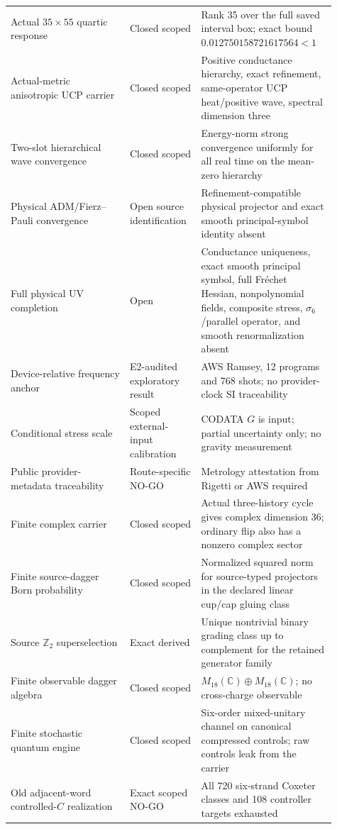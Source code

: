 \documentclass[11pt]{article}
\theoremstyle{definition}
\theoremstyle{remark}
\begin{document}
\begin{longtable}{>{\raggedright\arraybackslash}p{0.34\linewidth} >{\raggedright\arraybackslash}p{0.19\linewidth} >{\raggedright\arraybackslash}p{0.38\linewidth}}
Actual $35\times55$ quartic response & Closed scoped & Rank 35 over the full saved interval box; exact bound $0.012750158721617564<1$ \\
Actual-metric anisotropic UCP carrier & Closed scoped & Positive conductance hierarchy, exact refinement, same-operator UCP heat/positive wave, spectral dimension three \\
Two-slot hierarchical wave convergence & Closed scoped & Energy-norm strong convergence uniformly for all real time on the mean-zero hierarchy \\
Physical ADM/Fierz--Pauli convergence & Open source identification & Refinement-compatible physical projector and exact smooth principal-symbol identity absent \\
Full physical UV completion & Open & Conductance uniqueness, exact smooth principal symbol, full Fr\'echet Hessian, nonpolynomial fields, composite stress, $\sigma_6$/parallel operator, and smooth renormalization absent \\
Device-relative frequency anchor & E2-audited exploratory result & AWS Ramsey, 12 programs and 768 shots; no provider-clock SI traceability \\
Conditional stress scale & Scoped external-input calibration & CODATA $G$ is input; partial uncertainty only; no gravity measurement \\
Public provider-metadata traceability & Route-specific NO-GO & Metrology attestation from Rigetti or AWS required \\
Finite complex carrier & Closed scoped & Actual three-history cycle gives complex dimension 36; ordinary flip also has a nonzero complex sector \\
Finite source-dagger Born probability & Closed scoped & Normalized squared norm for source-typed projectors in the declared linear cup/cap gluing class \\
Source $\mathbb Z_2$ superselection & Exact derived & Unique nontrivial binary grading class up to complement for the retained generator family \\
Finite observable dagger algebra & Closed scoped & $M_{18}(\mathbb C)\oplus M_{18}(\mathbb C)$; no cross-charge observable \\
Finite stochastic quantum engine & Closed scoped & Six-order mixed-unitary channel on canonical compressed controls; raw controls leak from the carrier \\
Old adjacent-word controlled-$C$ realization & Exact scoped NO-GO & All 720 six-strand Coxeter classes and 108 controller targets exhausted \\

\end{longtable}
\end{document}
